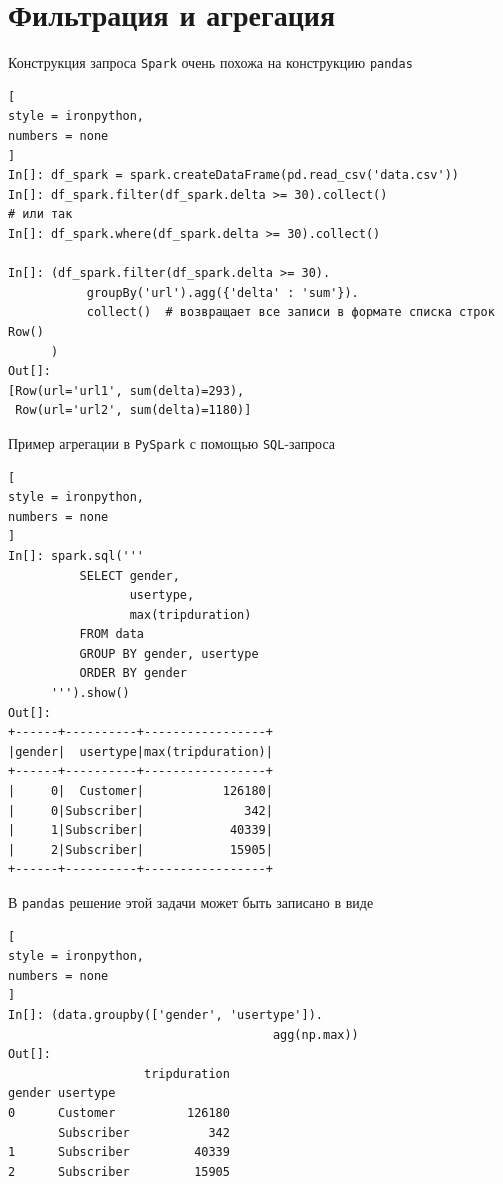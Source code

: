 \documentclass[%
	11pt,
	a4paper,
	utf8,
		]{article}
\begin{document}
\section{Фильтрация и агрегация}

Конструкция запроса \texttt{Spark} очень похожа на конструкцию \texttt{pandas}

\begin{lstlisting}[
style = ironpython,
numbers = none
]
In[]: df_spark = spark.createDataFrame(pd.read_csv('data.csv'))
In[]: df_spark.filter(df_spark.delta >= 30).collect()
# или так
In[]: df_spark.where(df_spark.delta >= 30).collect()

In[]: (df_spark.filter(df_spark.delta >= 30).
           groupBy('url').agg({'delta' : 'sum'}).
           collect()  # возвращает все записи в формате списка строк Row()
      )
Out[]:
[Row(url='url1', sum(delta)=293),
 Row(url='url2', sum(delta)=1180)]
\end{lstlisting}


\begin{minipage}[t]{0.45\textwidth}
Пример агрегации в \texttt{PySpark} с помощью \texttt{SQL}-запроса

\begin{lstlisting}[
style = ironpython,
numbers = none
]
In[]: spark.sql('''
          SELECT gender,
                 usertype,
                 max(tripduration)
          FROM data
          GROUP BY gender, usertype
          ORDER BY gender
      ''').show()
Out[]:
+------+----------+-----------------+
|gender|  usertype|max(tripduration)|
+------+----------+-----------------+
|     0|  Customer|           126180|
|     0|Subscriber|              342|
|     1|Subscriber|            40339|
|     2|Subscriber|            15905|
+------+----------+-----------------+
\end{lstlisting}
\end{minipage}
\hspace*{5mm}
\begin{minipage}[t]{0.48\textwidth}

В \texttt{pandas} решение этой задачи может быть записано в виде
\begin{lstlisting}[
style = ironpython,
numbers = none
]
In[]: (data.groupby(['gender', 'usertype']).
                                     agg(np.max))
Out[]:
                   tripduration
gender usertype                
0      Customer          126180
       Subscriber           342
1      Subscriber         40339
2      Subscriber         15905
\end{lstlisting}
\end{minipage}
\end{document}

